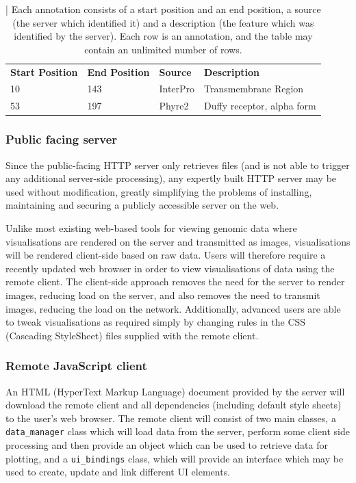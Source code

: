 \documentclass[fleqn,10pt]{article} %
\begin{document}
\begin{table}[h]
\begin{tabular}{llll}
\textbf{Start Position} & \textbf{End Position} & \textbf{Source} & \textbf{Description}       \\
10                      & 143                   & InterPro        & Transmembrane Region       \\
53                      & 197                   & Phyre2          & Duffy receptor, alpha form
\end{tabular}
\caption{ | Each annotation consists of a start position and an end position, a source (the server which identified it) and a description (the feature which was identified by the server). Each row is an annotation, and the table may contain an unlimited number of rows.}
\end{table}

\subsubsection{Public facing server}

Since the public-facing HTTP server only retrieves files (and is not able to trigger any additional server-side processing), any expertly built HTTP server may be used without modification, greatly simplifying the problems of installing, maintaining and securing a publicly accessible server on the web.

Unlike most existing web-based tools for viewing genomic data where visualisations are rendered on the server and transmitted as images, visualisations will be rendered client-side based on raw data. Users will therefore require a recently updated web browser in order to view visualisations of data using the remote client. The client-side approach removes the need for the server to render images, reducing load on the server, and also removes the need to transmit images, reducing the load on the network. Additionally, advanced users are able to tweak visualisations as required simply by changing rules in the CSS (Cascading StyleSheet) files supplied with the remote client.

\subsubsection{Remote JavaScript client}

An HTML (HyperText Markup Language) document provided by the server will download the remote client and all dependencies (including default style sheets) to the user's web browser. The remote client will consist of two main classes, a \texttt{data\_manager} class which will load data from the server, perform some client side processing and then provide an object which can be used to retrieve data for plotting, and a \texttt{ui\_bindings} class, which will provide an interface which may be used to create, update and link different UI elements.
\end{document}
